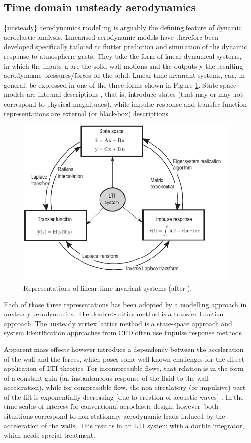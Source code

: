 \documentclass[11pt]{article}
\begin{document}
\subsection{Time domain unsteady aerodynamics}
\label{sec:org6655ebd}

\{unsteady\} aerodynamics modelling is arguably the defining feature of dynamic aeroelastic analysis. Linearised aerodynamic models have therefore been developed specifically tailored to flutter prediction and simulation of the dynamic response to atmospheric gusts. They take the form of linear dynamical systems, in which the inputs \(\textbf{u}\) are the solid wall motions and the outputs \(\textbf{y}\) the resulting aerodynamic pressures/forces on the solid.  Linear time-invariant systems, can, in general, be expressed in one of the three forms shown in Figure \ref{fig:rosetta_lti}. State-space models are internal descriptions \cite{Antoulas2005}, that is, introduce states (that may or may not correspond to physical magnitudes), while impulse response and transfer function representations are external (or black-box) descriptions. 
\begin{figure}[hbt!]
	\centering
	\includegraphics[width=.6\textwidth]{./img/rosetta_lti.pdf}
	\caption{\label{fig:rosetta_lti} Representations of linear time-invariant systems (after \cite{Brunton2019}).}
\end{figure}

Each of those three representations has been adopted by a modelling approach in unsteady aerodynamics. The doublet-lattice method \cite{Albano1969} is a transfer function approach. The unsteady vortex lattice method \cite{Katz2001} is a state-space approach and system identification approaches from CFD often use impulse response methods \cite{Silva2017}.

Apparent mass effects however introduce a dependency between the acceleration of the wall and the forces, which poses some well-known challenges for the direct application of LTI theories. For incompressible flows, that relation is in the form of a constant gain (an instantaneous response of the fluid to the wall acceleration), while for compressible flow, the non-circulatory (or impulsive) part of the lift is exponentially decreasing (due to  creation of acoustic waves) \cite{Leishman1988}. In the time scales of interest for conventional aeroelastic design, however, both situations correspond to non-stationary aerodynamic loads induced by the acceleration of the walls. This results in an LTI system with a double integrator, which needs special treatment. 
\end{document}
